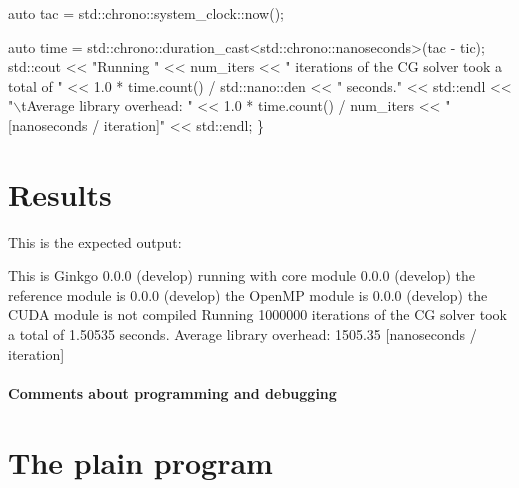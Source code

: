 \begin{DoxyCode}
    \textcolor{keyword}{auto} tac = std::chrono::system\_clock::now();

    \textcolor{keyword}{auto} time = std::chrono::duration\_cast<std::chrono::nanoseconds>(tac - tic);
    std::cout << \textcolor{stringliteral}{"Running "} << num\_iters
              << \textcolor{stringliteral}{" iterations of the CG solver took a total of "}
              << 1.0 * time.count() / std::nano::den << \textcolor{stringliteral}{" seconds."} << std::endl
              << \textcolor{stringliteral}{"\(\backslash\)tAverage library overhead:     "}
              << 1.0 * time.count() / num\_iters << \textcolor{stringliteral}{" [nanoseconds / iteration]"}
              << std::endl;
\}
\end{DoxyCode}
 \label{_Results}%
\section*{Results}

This is the expected output\+:


\begin{DoxyCode}
This is Ginkgo 0.0.0 (develop)
    running with core module 0.0.0 (develop)
    the reference module is  0.0.0 (develop)
    the OpenMP    module is  0.0.0 (develop)
    the CUDA      module is  not compiled
Running 1000000 iterations of the CG solver took a total of 1.50535 seconds.
        Average library overhead:     1505.35 [nanoseconds / iteration]
\end{DoxyCode}


\label{_Commentsaboutprogramminganddebugging}%
\paragraph*{Comments about programming and debugging }

\label{_PlainProg}%
 \section*{The plain program}


